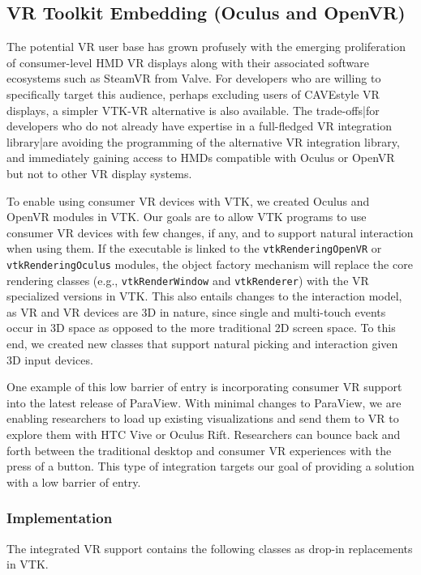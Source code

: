 \subsection{VR Toolkit Embedding (Oculus and OpenVR)}

The potential VR user base has grown profusely with the emerging
proliferation of consumer-level HMD VR displays along with their associated
software ecosystems such as SteamVR from Valve.
For developers who are willing to specifically target this audience, perhaps
excluding users of CAVE\texttrademark style VR displays, a simpler VTK-VR alternative is
also available.
The trade-offs|for developers who do not already have expertise in a
full-fledged VR integration library|are avoiding the programming of
the alternative VR integration library, and immediately gaining access
to HMDs compatible with Oculus or OpenVR but not to other VR display systems.

To enable using consumer VR devices with VTK, we created Oculus and OpenVR modules in VTK.
Our goals are to allow VTK programs to use consumer VR devices with few changes, if any, and to support natural interaction when using them.
If the executable is linked to the \texttt{vtkRenderingOpenVR} or \texttt{vtkRenderingOculus} modules, the object factory
mechanism will replace the core rendering classes (e.g.,
\texttt{vtkRenderWindow} and \texttt{vtkRenderer}) with the VR specialized versions in VTK.  This also entails changes to the 
interaction model, as VR and VR devices are 3D in nature, since single and multi-touch events occur in 3D space as 
opposed to the more traditional 2D screen space. To this end, we created new classes that support natural picking and interaction given 3D 
input devices.

One example of this low barrier of entry is incorporating consumer VR support into the latest release of ParaView. With minimal changes to ParaView, we are enabling researchers to load up existing visualizations and send them to VR to explore them with HTC Vive or Oculus Rift. Researchers can bounce back and forth between the traditional desktop and consumer VR experiences with the press of a button. This type of integration targets our goal of providing a solution with a low barrier of entry.

\subsubsection{Implementation}

The integrated VR support contains the following classes as drop-in replacements in VTK.

